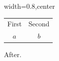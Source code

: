 \documentclass{article}
\begin{document}
\begin{adjustbox}{width=0.8\textwidth,center}
\begin{tabular}{cc}First & Second\\ $a$ & $b$\end{tabular}
\end{adjustbox}
After.
\end{document}
